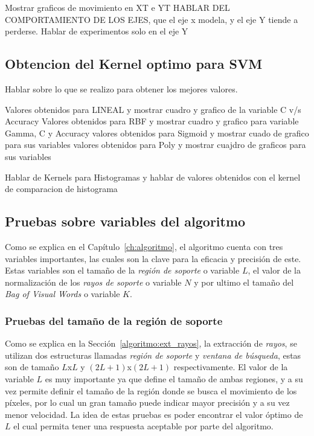 Mostrar graficos de movimiento en XT e YT
HABLAR DEL COMPORTAMIENTO DE LOS EJES, que el eje x modela, y el eje Y tiende a perderse.
Hablar de experimentos solo en el eje Y


\subsection{Obtencion del Kernel optimo para SVM}

Hablar sobre lo que se realizo para obtener los mejores valores.

Valores obtenidos para LINEAL y mostrar cuadro y grafico de la variable C v/s Accuracy
Valores obtenidos para RBF y mostrar cuadro y grafico para variable Gamma, C y Accuracy
valores obtenidos para Sigmoid y mostrar cuado de grafico para sus variables
valores obtenidos para Poly y mostrar cuajdro de graficos para sus variables

Hablar de Kernels para Histogramas y hablar de valores obtenidos con el kernel de comparacion de histograma


\subsection{Pruebas sobre variables del algoritmo}
\label{exp:var}
Como se explica en el Capítulo~\ref{ch:algoritmo}, el algoritmo cuenta con tres variables importantes, las cuales son la clave para la eficacia y precisión de este. Estas variables son el tamaño de la \textit{región de soporte} o variable $L$, el valor de la normalización de los \textit{rayos de soporte} o variable $N$ y por ultimo el tamaño del \textit{Bag of Visual Words} o variable $K$.

\subsubsection{Pruebas del tamaño de la región de soporte}
Como se explica en la Sección~\ref{algoritmo:ext_rayos}, la extracción de \textit{rayos}, se utilizan dos estructuras llamadas \textit{región de soporte} y \textit{ventana de búsqueda}, estas son de tamaño $L$x$L$ y $(2L+1)$x$(2L+1)$ respectivamente. El valor de la variable $L$ es muy importante ya que define el tamaño de ambas regiones, y a su vez permite definir el tamaño de la región donde se busca el movimiento de los píxeles, por lo cual un gran tamaño puede indicar mayor precisión y a su vez menor velocidad. La idea de estas pruebas es poder encontrar el valor óptimo de $L$ el cual permita tener una respuesta aceptable por parte del algoritmo. 

